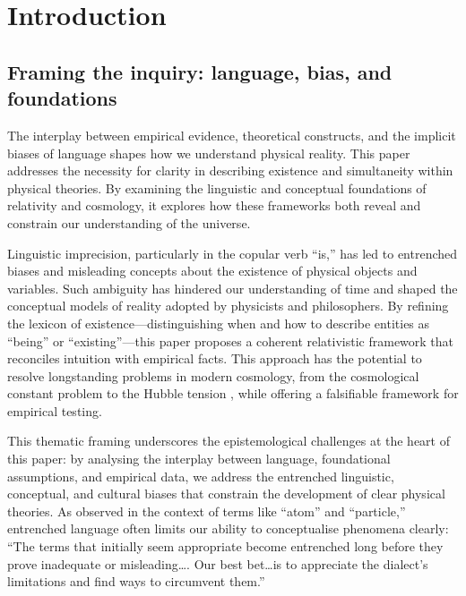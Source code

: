 \documentclass[aps,rmp,groupedaddress,twocolumn,10pt]{revtex4-2}
\begin{document}
\maketitle

\tableofcontents

\section{Introduction}\label{sec:intro}

\subsection{Framing the inquiry: language, bias, and foundations}

The interplay between empirical evidence, theoretical constructs, and the implicit biases of language shapes how we understand physical reality. This paper addresses the necessity for clarity in describing existence and simultaneity within physical theories. By examining the linguistic and conceptual foundations of relativity and cosmology, it explores how these frameworks both reveal and constrain our understanding of the universe.

Linguistic imprecision, particularly in the copular verb ``is,'' has led to entrenched biases and misleading concepts about the existence of physical objects and variables. Such ambiguity has hindered our understanding of time and shaped the conceptual models of reality adopted by physicists and philosophers. By refining the lexicon of existence---distinguishing when and how to describe entities as ``being'' or ``existing''---this paper proposes a coherent relativistic framework that reconciles intuition with empirical facts. This approach has the potential to resolve longstanding problems in modern cosmology, from the cosmological constant problem \cite{Weinberg1989,Carroll1992} to the Hubble tension \cite{Freedman2017,Verde2019,Freedman2023,Riess2024}, while offering a falsifiable framework for empirical testing.

This thematic framing underscores the epistemological challenges at the heart of this paper: by analysing the interplay between language, foundational assumptions, and empirical data, we address the entrenched linguistic, conceptual, and cultural biases that constrain the development of clear physical theories. As \citet{strassler2024} observed in the context of terms like ``atom'' and ``particle,'' entrenched language often limits our ability to conceptualise phenomena clearly: ``The terms that initially seem appropriate become entrenched long before they prove inadequate or misleading\ldots. Our best bet\ldots is to appreciate the dialect's limitations and find ways to circumvent them.''
\end{document}
